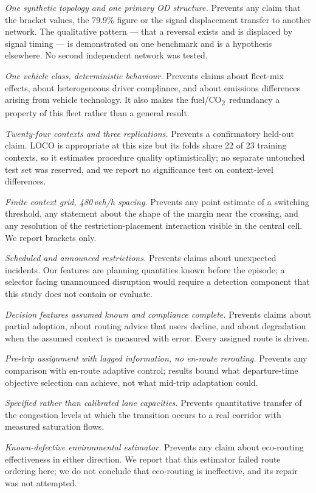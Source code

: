 \documentclass[10pt,a4paper]{article}
\newcommand{\CO}{CO\textsubscript{2}}
\begin{document}
\emph{One synthetic topology and one primary OD structure.} Prevents any claim that the bracket values, the 79.9\% figure or the signal displacement transfer to another network. The qualitative pattern --- that a reversal exists and is displaced by signal timing --- is demonstrated on one benchmark and is a hypothesis elsewhere. No second independent network was tested.

\emph{One vehicle class, deterministic behaviour.} Prevents claims about fleet-mix effects, about heterogeneous driver compliance, and about emissions differences arising from vehicle technology. It also makes the fuel/\CO\ redundancy a property of this fleet rather than a general result.

\emph{Twenty-four contexts and three replications.} Prevents a confirmatory held-out claim. LOCO is appropriate at this size but its folds share 22 of 23 training contexts, so it estimates procedure quality optimistically; no separate untouched test set was reserved, and we report no significance test on context-level differences.

\emph{Finite context grid, 480\,veh/h spacing.} Prevents any point estimate of a switching threshold, any statement about the shape of the margin near the crossing, and any resolution of the restriction-placement interaction visible in the central cell. We report brackets only.

\emph{Scheduled and announced restrictions.} Prevents claims about unexpected incidents. Our features are planning quantities known before the episode; a selector facing unannounced disruption would require a detection component that this study does not contain or evaluate.

\emph{Decision features assumed known and compliance complete.} Prevents claims about partial adoption, about routing advice that users decline, and about degradation when the assumed context is measured with error. Every assigned route is driven.

\emph{Pre-trip assignment with lagged information, no en-route rerouting.} Prevents any comparison with en-route adaptive control; results bound what departure-time objective selection can achieve, not what mid-trip adaptation could.

\emph{Specified rather than calibrated lane capacities.} Prevents quantitative transfer of the congestion levels at which the transition occurs to a real corridor with measured saturation flows.

\emph{Known-defective environmental estimator.} Prevents any claim about eco-routing effectiveness in either direction. We report that this estimator failed route ordering here; we do not conclude that eco-routing is ineffective, and its repair was not attempted.
\end{document}
